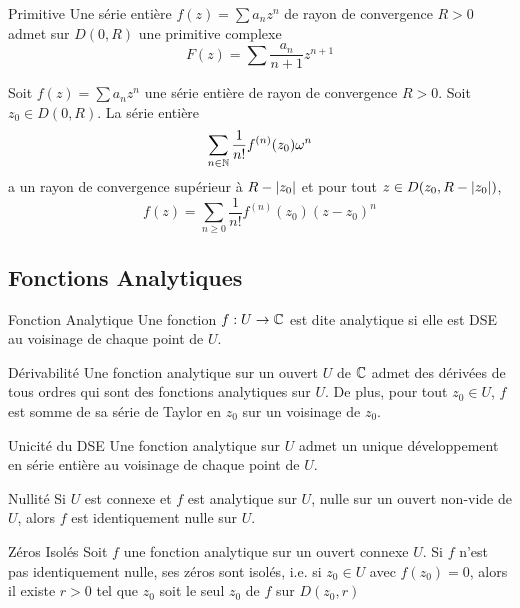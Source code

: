 \documentclass{cours}
\begin{document}
\begin{corollaire}{Primitive}{}
    Une série entière $f(z) = \sum a_{n}z^{n}$ de rayon de convergence $R > 0$ admet sur $D(0, R)$ une primitive complexe
    \[
        F(z) = \sum \frac{a_{n}}{n + 1}z^{n + 1}
    \]
\end{corollaire}

\begin{propositionfr}
    Soit $f(z) = \sum a_{n}z^{n}$ une série entière de rayon de convergence $R > 0$. Soit $z_{0} \in D(0, R)$. La série entière 
    \[
        \sum_{n \in \mathbb{N}}\frac{1}{n!}f^{(n)}(z_{0})\omega^{n}
    \]
    a un rayon de convergence supérieur à $R - \left|z_{0}\right|$ et pour tout $z \in D(z_{0}, R - \left|z_{0}\right|)$,
    \[
        f(z) = \sum_{n \geq 0} \frac{1}{n !}f^{(n)}(z_{0})(z - z_{0})^{n}
    \]
\end{propositionfr}

\subsection{Fonctions Analytiques}
\begin{définition}{Fonction Analytique}{}
    Une fonction $f : U \to \mathbb{C}$ est dite analytique si elle est DSE au voisinage de chaque point de $U$. 
\end{définition}

\begin{propositionfr}{Dérivabilité}{}
    Une fonction analytique sur un ouvert $U$ de $\mathbb{C}$ admet des dérivées de tous ordres qui sont des fonctions analytiques sur $U$. De plus, pour tout $z_{0} \in U$, $f$ est somme de sa série de Taylor en $z_{0}$ sur un voisinage de $z_{0}$.
\end{propositionfr}

\begin{corollaire}{Unicité du DSE}{}
    Une fonction analytique sur $U$ admet un unique développement en série entière au voisinage de chaque point de $U$.
\end{corollaire}

\begin{lemme}{Nullité}{}
    Si $U$ est connexe et $f$ est analytique sur $U$, nulle sur un ouvert non-vide de $U$, alors $f$ est identiquement nulle sur $U$. 
\end{lemme}

\begin{propositionfr}{Zéros Isolés}
    Soit $f$ une fonction analytique sur un ouvert connexe $U$. Si $f$ n'est pas identiquement nulle, ses zéros sont isolés, i.e. si $z_{0} \in U$ avec $f(z_{0}) = 0$, alors il existe $r > 0$ tel que $z_{0}$ soit le seul $z_{0}$ de $f$ sur $D(z_{0}, r)$
\end{propositionfr}
\end{document}
